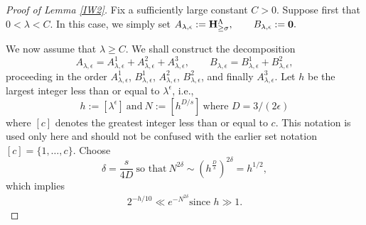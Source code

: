 \documentclass[10pt,a4paper]{amsart}
\numberwithin{equation}{section}
\begin{document}
\begin{proof}[Proof of Lemma \ref{IW2}]
	Fix a sufficiently large constant $C>0$. Suppose first that
	$0<\lambda<C$. In this case, we simply set 
	$A_{\lambda,\epsilon}:={\bf H}_{\ge \sigma}^{\Lambda},
	\qquad
	B_{\lambda,\epsilon}:={\bf 0}.$

	
We now assume that $\lambda\ge C$. We shall construct the decomposition
	\[
	A_{\lambda,\epsilon}
	=
	A_{\lambda,\epsilon}^{1}
	+
	A_{\lambda,\epsilon}^{2}
	+
	A_{\lambda,\epsilon}^{3},
	\qquad
	B_{\lambda,\epsilon}
	=
	B_{\lambda,\epsilon}^{1}
	+
	B_{\lambda,\epsilon}^{2},
	\]
	proceeding in the order
	\(A_{\lambda,\epsilon}^{1}\),
\(B_{\lambda,\epsilon}^{1}\),
	\(A_{\lambda,\epsilon}^{2}\),
	\(B_{\lambda,\epsilon}^{2}\),
	and finally
	\(A_{\lambda,\epsilon}^{3}\).
	Let $h$ be the largest integer less than or equal to $\lambda^{\epsilon}$, i.e.,
\[
h := [\lambda^{\epsilon}]\ \text{and}\  N:=[h^{D/s}]\ \text{where $D=3/(2\epsilon)$}
\]
where  $[c]$ denotes the greatest integer less than or equal to $c$. This notation is used only here and should not be confused with the earlier set notation $[c]=\{1,\dots,c\}$.  	Choose $$\delta=\frac{s}{4D}\ \text{so that}\ N^{2\delta}\sim (h^{\frac{D}{s}})^{2\delta}=h^{1/2},$$  
which implies \begin{align}\label{hh}
  2^{-h/10}\ll e^{-N^{2 \delta}} \text{since $h\gg1$}.
\end{align}


\end{proof}
\end{document}
